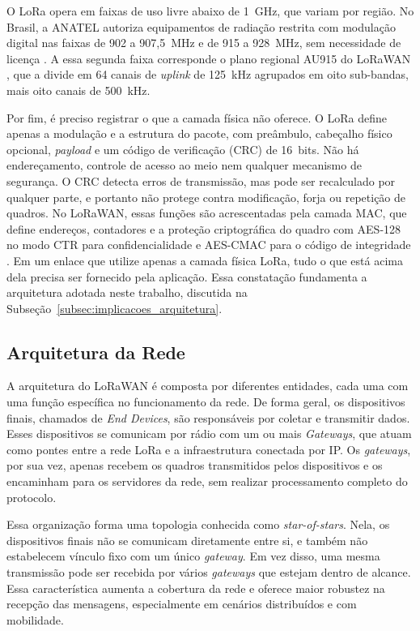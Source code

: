 O LoRa opera em faixas de uso livre abaixo de 1~GHz, que variam por região. No Brasil, a ANATEL autoriza equipamentos de radiação restrita com modulação digital nas faixas de 902 a 907,5~MHz e de 915 a 928~MHz, sem necessidade de licença \cite{anatel_radiacao_restrita}. A essa segunda faixa corresponde o plano regional AU915 do LoRaWAN \cite{lorawan_rp002}, que a divide em 64 canais de \textit{uplink} de 125~kHz agrupados em oito sub-bandas, mais oito canais de 500~kHz.

Por fim, é preciso registrar o que a camada física não oferece. O LoRa define apenas a modulação e a estrutura do pacote, com preâmbulo, cabeçalho físico opcional, \textit{payload} e um código de verificação (CRC) de 16~bits. Não há endereçamento, controle de acesso ao meio nem qualquer mecanismo de segurança. O CRC detecta erros de transmissão, mas pode ser recalculado por qualquer parte, e portanto não protege contra modificação, forja ou repetição de quadros. No LoRaWAN, essas funções são acrescentadas pela camada MAC, que define endereços, contadores e a proteção criptográfica do quadro com AES-128 no modo CTR para confidencialidade e AES-CMAC para o código de integridade \cite{lorawan104}. Em um enlace que utilize apenas a camada física LoRa, tudo o que está acima dela precisa ser fornecido pela aplicação. Essa constatação fundamenta a arquitetura adotada neste trabalho, discutida na Subseção~\ref{subsec:implicacoes_arquitetura}.



\subsection{Arquitetura da Rede}

A arquitetura do LoRaWAN é composta por diferentes entidades, cada uma com uma função específica no funcionamento da rede. De forma geral, os dispositivos finais, chamados de \textit{End Devices}, são responsáveis por coletar e transmitir dados. Esses dispositivos se comunicam por rádio com um ou mais \textit{Gateways}, que atuam como pontes entre a rede LoRa e a infraestrutura conectada por IP. Os \textit{gateways}, por sua vez, apenas recebem os quadros transmitidos pelos dispositivos e os encaminham para os servidores da rede, sem realizar processamento completo do protocolo. \cite{hessel2023lorawan}

Essa organização forma uma topologia conhecida como \textit{star-of-stars}. Nela, os dispositivos finais não se comunicam diretamente entre si, e também não estabelecem vínculo fixo com um único \textit{gateway}. Em vez disso, uma mesma transmissão pode ser recebida por vários \textit{gateways} que estejam dentro de alcance. Essa característica aumenta a cobertura da rede e oferece maior robustez na recepção das mensagens, especialmente em cenários distribuídos e com mobilidade.

